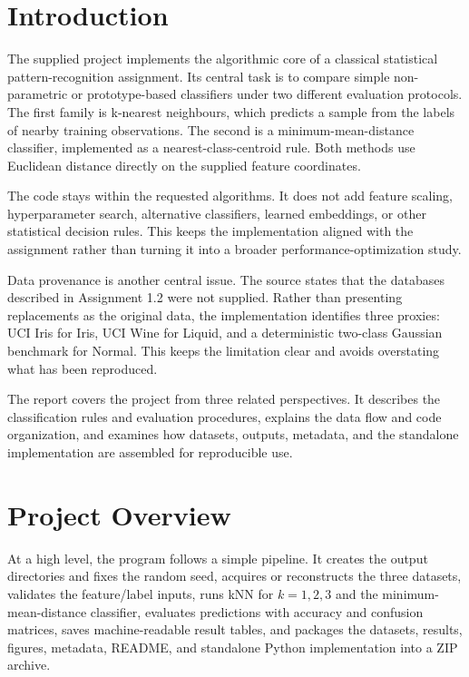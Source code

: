 \documentclass[11pt,a4paper]{article}
\begin{document}
\tableofcontents
\newpage

\section{Introduction}

The supplied project implements the algorithmic core of a classical statistical pattern-recognition assignment. Its central task is to compare simple non-parametric or prototype-based classifiers under two different evaluation protocols. The first family is k-nearest neighbours, which predicts a sample from the labels of nearby training observations. The second is a minimum-mean-distance classifier, implemented as a nearest-class-centroid rule. Both methods use Euclidean distance directly on the supplied feature coordinates.

The code stays within the requested algorithms. It does not add feature scaling, hyperparameter search, alternative classifiers, learned embeddings, or other statistical decision rules. This keeps the implementation aligned with the assignment rather than turning it into a broader performance-optimization study.

Data provenance is another central issue. The source states that the databases described in Assignment 1.2 were not supplied. Rather than presenting replacements as the original data, the implementation identifies three proxies: UCI Iris for Iris, UCI Wine for Liquid, and a deterministic two-class Gaussian benchmark for Normal. This keeps the limitation clear and avoids overstating what has been reproduced.

The report covers the project from three related perspectives. It describes the classification rules and evaluation procedures, explains the data flow and code organization, and examines how datasets, outputs, metadata, and the standalone implementation are assembled for reproducible use.

\section{Project Overview}

At a high level, the program follows a simple pipeline. It creates the output directories and fixes the random seed, acquires or reconstructs the three datasets, validates the feature/label inputs, runs kNN for $k=1,2,3$ and the minimum-mean-distance classifier, evaluates predictions with accuracy and confusion matrices, saves machine-readable result tables, and packages the datasets, results, figures, metadata, README, and standalone Python implementation into a ZIP archive.
\end{document}
